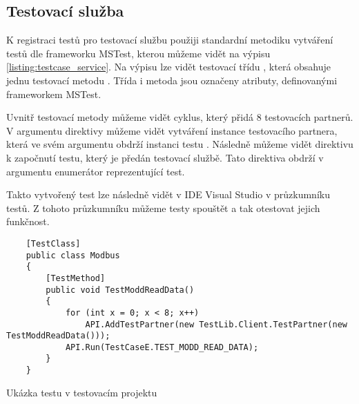 \subsection{Testovací služba}

K registraci testů pro testovací službu použiji standardní metodiku vytváření testů dle frameworku MSTest, kterou můžeme vidět na výpisu \ref{listing:testcase_service}. Na výpisu lze vidět testovací třídu , která obsahuje jednu testovací metodu . Třída i metoda jsou označeny atributy, definovanými frameworkem MSTest. 

Uvnitř testovací metody můžeme vidět cyklus, který přidá 8 testovacích partnerů. V argumentu direktivy můžeme vidět vytváření instance testovacího partnera, která ve svém argumentu obdrží instanci testu . Následně můžeme vidět direktivu k započnutí testu, který je předán testovací službě. Tato direktiva obdrží v argumentu enumerátor reprezentující test.

Takto vytvořený test lze následně vidět v IDE Visual Studio v průzkumníku testů. Z tohoto průzkumníku můžeme testy spouštět a tak otestovat jejich funkčnost.  

\begin{listing}[htbp]
    \centering
    \begin{verbatim}
    [TestClass]
    public class Modbus
    {
        [TestMethod]
        public void TestModdReadData()
        {
            for (int x = 0; x < 8; x++)
                API.AddTestPartner(new TestLib.Client.TestPartner(new TestModdReadData()));
            API.Run(TestCaseE.TEST_MODD_READ_DATA);
        }
    }
    \end{verbatim}
\caption{Ukázka testu v testovacím projektu}
\label{listing:testcase_service}
\end{listing}


